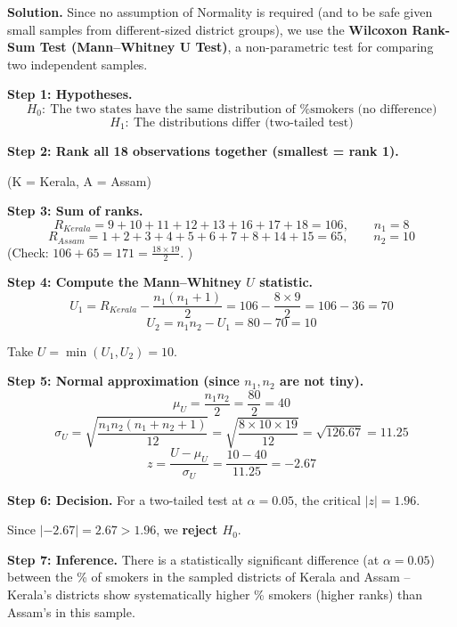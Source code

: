 \documentclass[11pt]{article}
\newcommand{\soln}{\par\noindent\textcolor{acolor}{\textbf{Solution.}}\quad}
\begin{document}
\soln
Since no assumption of Normality is required (and to be safe given small samples from different-sized district groups), we use the \textbf{Wilcoxon Rank-Sum Test (Mann--Whitney U Test)}, a non-parametric test for comparing two independent samples.

\textbf{Step 1: Hypotheses.}
\[
H_0:\ \text{The two states have the same distribution of \% smokers (no difference)}
\]
\[
H_1:\ \text{The distributions differ (two-tailed test)}
\]

\textbf{Step 2: Rank all 18 observations together (smallest = rank 1).}

\begin{center}
\end{center}
(K = Kerala, A = Assam)

\textbf{Step 3: Sum of ranks.}
\[
R_{Kerala} = 9+10+11+12+13+16+17+18 = 106, \qquad n_1 = 8
\]
\[
R_{Assam} = 1+2+3+4+5+6+7+8+14+15 = 65, \qquad n_2 = 10
\]
(Check: $106+65 = 171 = \frac{18\times19}{2}$. \checkmark)

\textbf{Step 4: Compute the Mann--Whitney $U$ statistic.}
\[
U_1 = R_{Kerala} - \frac{n_1(n_1+1)}{2} = 106 - \frac{8\times9}{2} = 106-36 = 70
\]
\[
U_2 = n_1 n_2 - U_1 = 80-70 = 10
\]

Take $U = \min(U_1,U_2) = 10$.

\textbf{Step 5: Normal approximation (since $n_1, n_2$ are not tiny).}
\[
\mu_U = \frac{n_1 n_2}{2} = \frac{80}{2} = 40
\]
\[
\sigma_U = \sqrt{\frac{n_1 n_2 (n_1+n_2+1)}{12}} = \sqrt{\frac{8\times10\times19}{12}} = \sqrt{126.67} = 11.25
\]
\[
z = \frac{U - \mu_U}{\sigma_U} = \frac{10-40}{11.25} = -2.67
\]

\textbf{Step 6: Decision.} For a two-tailed test at $\alpha=0.05$, the critical $|z| = 1.96$.

Since $|{-2.67}| = 2.67 > 1.96$, we \textbf{reject $H_0$}.

\textbf{Step 7: Inference.} There is a statistically significant difference (at $\alpha=0.05$) between the \% of smokers in the sampled districts of Kerala and Assam -- Kerala's districts show systematically higher \% smokers (higher ranks) than Assam's in this sample.
\end{document}
